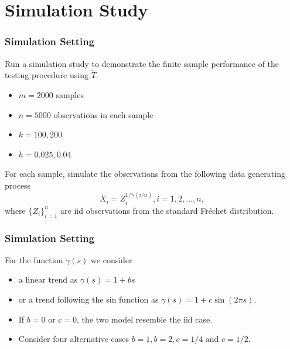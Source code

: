 \documentclass{beamer}
\begin{document}
\section{Simulation Study}

\begin{frame}
    \frametitle{Simulation Setting}
Run a simulation study to demonstrate the finite sample performance of the testing procedure using $\tilde{T}$.

\begin{itemize}
    \item $m=2000$ samples
    \item  $n=5000$ observations in each sample
    \item  $k=100,200$
    \item  $h=0.025,0.04$
\end{itemize}
  
    
    For each sample,  simulate the observations from the following data generating process
    $$
    X_i=Z_i^{1/\gamma(i/n)}, i=1,2,\dots,n,
    $$
    where $\{Z_i\}_{i=1}^n$ are iid observations from the standard Fr\'echet distribution.
\end{frame}

\begin{frame}
    \frametitle{Simulation Setting}
    For the function $\gamma(s)$ we consider 
    \begin{itemize}
        \item  a linear trend as $\gamma(s)=1+bs$
        \medskip
        \item  or a trend following the sin function as $\gamma(s)=1+c\sin(2\pi s)$.
    \end{itemize}

    \bigskip

    \begin{itemize}
        \item 
        If $b=0$ or $c=0$, the two model resemble the iid case.
        \medskip
        \item     
        Consider four alternative cases $b=1, b=2, c=1/4$ and $c=1/2$.
    \end{itemize}
\end{frame}
\end{document}
